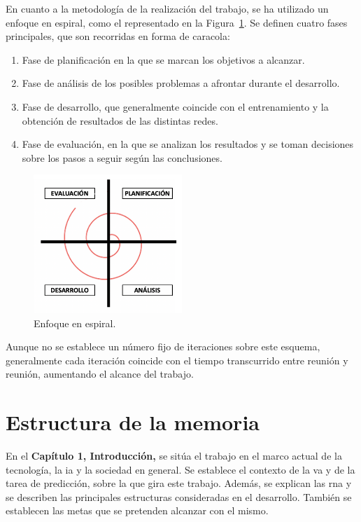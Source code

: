 En cuanto a la metodología de la realización del trabajo, se ha utilizado un enfoque en espiral, como el representado en la Figura~\ref{fig.espiral}. Se definen cuatro fases principales, que son recorridas en forma de caracola: 
\begin{enumerate}
    \item Fase de planificación en la que se marcan los objetivos a alcanzar.
    \item Fase de análisis de los posibles problemas a afrontar durante el desarrollo.
    \item Fase de desarrollo, que generalmente coincide con el entrenamiento y la obtención de resultados de las distintas redes.
    \item Fase de evaluación, en la que se analizan los resultados y se toman decisiones sobre los pasos a seguir según las conclusiones.
\end{enumerate}

\begin{figure}[H]
	\begin{center}
		\includegraphics[width=0.5\textwidth]{ figures/intro/espiral.png}
		\caption{Enfoque en espiral.}
		\label{fig.espiral}
	\end{center}
\end{figure}
\vspace{-10pt}

Aunque no se establece un número fijo de iteraciones sobre este esquema, generalmente cada iteración coincide con el tiempo transcurrido entre reunión y reunión, aumentando el alcance del trabajo.

\section{Estructura de la memoria}
En el \textbf{Capítulo 1, Introducción,} se sitúa el trabajo en el marco actual de la tecnología, la \acrshort{ia} y la sociedad en general. Se establece el contexto de la \acrshort{va} y de la tarea de predicción, sobre la que gira este trabajo. Además, se explican las \acrshort{rna} y se describen las principales estructuras consideradas en el desarrollo. También se establecen las metas que se pretenden alcanzar con el mismo.\\

